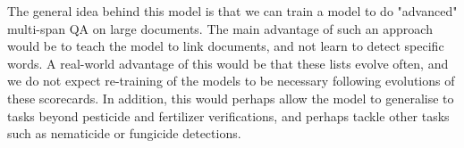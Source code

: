 The general idea behind this model is that we can train a model to do "advanced" multi-span QA on large documents.
The main advantage of such an approach would be to teach the model to link documents, and not learn to detect 
specific words. A real-world advantage of this would be that these lists evolve often, and we do not expect
re-training of the models to be necessary following evolutions of these scorecards. 
In addition, this would perhaps allow the model to generalise to tasks beyond pesticide and fertilizer verifications,
and perhaps tackle other tasks such as nematicide or fungicide detections. 
